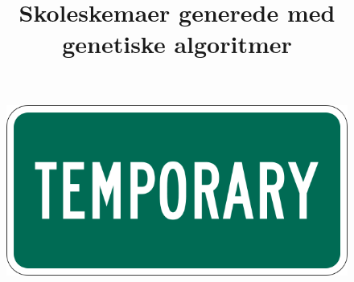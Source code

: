 \begin{titlepage}
  \title{Skoleskemaer generede med genetiske algoritmer}
   \maketitle
   \vspace{2cm}
   \begin{figure}[h]
      \centering
      \includegraphics[width=\textwidth]{graphics/forside.png}
   \end{figure}
\end{titlepage}
\clearpage
{}